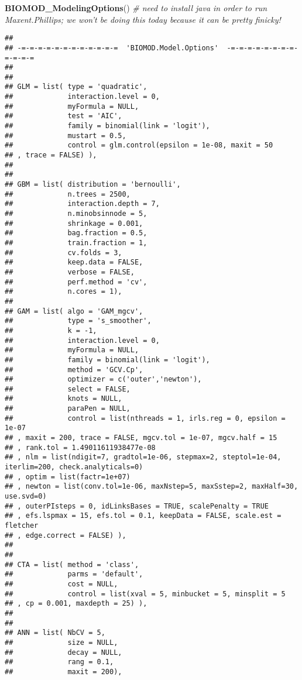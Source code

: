 \documentclass[]{article}
\newenvironment{Shaded}{\begin{snugshade}}{\end{snugshade}}
\newcommand{\KeywordTok}[1]{\textcolor[rgb]{0.13,0.29,0.53}{\textbf{#1}}}
\newcommand{\CommentTok}[1]{\textcolor[rgb]{0.56,0.35,0.01}{\textit{#1}}}
\newcommand{\NormalTok}[1]{#1}
\begin{document}
\begin{Shaded}
\begin{Highlighting}[]
\KeywordTok{BIOMOD_ModelingOptions}\NormalTok{() }\CommentTok{# need to install java in order to run Maxent.Phillips; we won't be doing this today because it can be pretty finicky!}
\end{Highlighting}
\end{Shaded}

\begin{verbatim}
## 
## -=-=-=-=-=-=-=-=-=-=-=-=  'BIOMOD.Model.Options'  -=-=-=-=-=-=-=-=-=-=-=-=
## 
## 
## GLM = list( type = 'quadratic',
##             interaction.level = 0,
##             myFormula = NULL,
##             test = 'AIC',
##             family = binomial(link = 'logit'),
##             mustart = 0.5,
##             control = glm.control(epsilon = 1e-08, maxit = 50
## , trace = FALSE) ),
## 
## 
## GBM = list( distribution = 'bernoulli',
##             n.trees = 2500,
##             interaction.depth = 7,
##             n.minobsinnode = 5,
##             shrinkage = 0.001,
##             bag.fraction = 0.5,
##             train.fraction = 1,
##             cv.folds = 3,
##             keep.data = FALSE,
##             verbose = FALSE,
##             perf.method = 'cv',
##             n.cores = 1),
## 
## GAM = list( algo = 'GAM_mgcv',
##             type = 's_smoother',
##             k = -1,
##             interaction.level = 0,
##             myFormula = NULL,
##             family = binomial(link = 'logit'),
##             method = 'GCV.Cp',
##             optimizer = c('outer','newton'),
##             select = FALSE,
##             knots = NULL,
##             paraPen = NULL,
##             control = list(nthreads = 1, irls.reg = 0, epsilon = 1e-07
## , maxit = 200, trace = FALSE, mgcv.tol = 1e-07, mgcv.half = 15
## , rank.tol = 1.49011611938477e-08
## , nlm = list(ndigit=7, gradtol=1e-06, stepmax=2, steptol=1e-04, iterlim=200, check.analyticals=0)
## , optim = list(factr=1e+07)
## , newton = list(conv.tol=1e-06, maxNstep=5, maxSstep=2, maxHalf=30, use.svd=0)
## , outerPIsteps = 0, idLinksBases = TRUE, scalePenalty = TRUE
## , efs.lspmax = 15, efs.tol = 0.1, keepData = FALSE, scale.est = fletcher
## , edge.correct = FALSE) ),
## 
## 
## CTA = list( method = 'class',
##             parms = 'default',
##             cost = NULL,
##             control = list(xval = 5, minbucket = 5, minsplit = 5
## , cp = 0.001, maxdepth = 25) ),
## 
## 
## ANN = list( NbCV = 5,
##             size = NULL,
##             decay = NULL,
##             rang = 0.1,
##             maxit = 200),

\end{verbatim}
\end{document}
